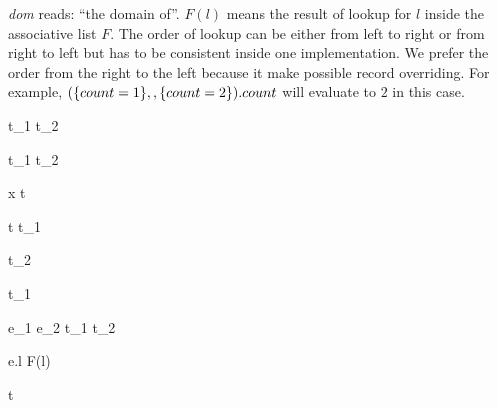 \textit{dom} reads: ``the domain of''. $ F(l) $ means the result of lookup for
$ l $ inside the associative list $ F $. The order of lookup can be either from
left to right or from right to left but has to be consistent inside one
implementation. We prefer the order from the right to the left because it make
possible record overriding. For example,
$ (\{ count = 1 \} ,, \{ count = 2 \}).count $ will evaluate to
$ 2 $ in this case.



\infrule[WF-Var]
{\alpha \in \Gamma}
{\Gamma \turns \alpha}

{\Gamma \turns t_1 \to t_2}

{\Gamma \turns {}}

{\Gamma \turns t_1 \with t_2}

{\Gamma \turns {}}



{\typing {\Gamma} {x} {t}}

{\typing {\Gamma} {} {t \to t_1}}

{\typing {\Gamma} {} {}}

{\typing {\Gamma} {} {t_2}}

{\typing {\Gamma} {} { t_1}}

{\typing {\Gamma} {e_1 \dcomma e_2} {t_1 \with t_2}}

{\typing {\Gamma} {} {}}

{\typing {\Gamma} {e.l} {F(l)}}

{\typing {\Gamma} {} {t}}